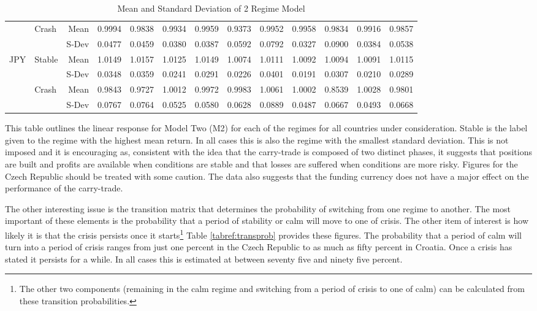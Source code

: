 \documentclass[12pt, a4paper, oneside]{article}\usepackage[]{graphicx}\usepackage[]{color}
\begin{document}
\begin{sidewaystable}[p]
\begin{threeparttable}
\begin{tabular}{llrrrrrrrrrrr}
   & \multirow{2}{*}{Crash}& Mean & 0.9994 & 0.9838 & 0.9934 & 0.9959 & 0.9373 & 0.9952 & 0.9958 & 0.9834 & 0.9916 & 0.9857 \\ 
  & & S-Dev & 0.0477 & 0.0459 & 0.0380 & 0.0387 & 0.0592 & 0.0792 & 0.0327 & 0.0900 & 0.0384 & 0.0538 \\ 
\hline  
  \multirow{4}{*}{JPY}&\multirow{2}{*}{Stable}& Mean& 1.0149 & 1.0157 & 1.0125 & 1.0149 & 1.0074 & 1.0111 & 1.0092 & 1.0094 & 1.0091 & 1.0115 \\ 
 & & S-Dev &0.0348 & 0.0359 & 0.0241 & 0.0291 & 0.0226 & 0.0401 & 0.0191 & 0.0307 & 0.0210 & 0.0289 \\ 
  & \multirow{2}{*}{Crash}&Mean & 0.9843 & 0.9727 & 1.0012 & 0.9972 & 0.9983 & 1.0061 & 1.0002 & 0.8539 & 1.0028 & 0.9801 \\ 
  & & S-Dev& 0.0767 & 0.0764 & 0.0525 & 0.0580 & 0.0628 & 0.0889 & 0.0487 & 0.0667 & 0.0493 & 0.0668 \\ 
   \hline
\end{tabular}
\begin{tablenotes}
\small
\item
This table outlines the linear response for Model Two (M2) for each of the regimes for all countries under consideration.  Stable is the label given to the regime with the highest mean return.  In all cases this is also the regime with the smallest standard deviation. This is not imposed and it is encouraging as, consistent with the idea that the carry-trade is composed of two distinct phases, it suggests that positions are built and profits are available when conditions are stable and that losses are suffered when conditions are more risky.  Figures for the Czech Republic should be treated with some caution.  The data also suggests that the funding currency does not have a major effect on the performance of the carry-trade.   
\end{tablenotes}
\caption{Mean and Standard Deviation of 2 Regime Model}
\label{tabref:2stateresponse}
\end{threeparttable}
  \end{sidewaystable}

The other interesting issue is the transition matrix that determines the probability of switching from one regime to another. The most important of these elements is the probability that a period of stability or calm will move to one of crisis.  The other item of interest is how likely it is that the crisis persists once it starts\footnote{The other two components (remaining in the calm regime and switching from a period of crisis to one of calm) can be calculated from these transition probabilities.}  Table \ref{tabref:transprob} provides these figures.  The probability that a period of calm will turn into a period of crisis ranges from just one percent in the Czech Republic to as much as fifty percent in Croatia. Once a crisis has stated it persists for a while. In all cases this is estimated at between seventy five and ninety five percent.
\end{document}
